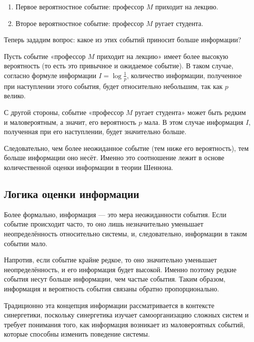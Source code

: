 \documentclass[12pt,a4paper]{article}
\newenvironment{exbox}[1][]{%
  \begin{tcolorbox}[enhanced, breakable, colback=excolor, colframe=brown!50!black, title=#1, fonttitle=\bfseries, arc=3pt, boxrule=0.5pt]
}{\end{tcolorbox}}
\newenvironment{rembox}[1][]{%
  \begin{tcolorbox}[enhanced, breakable, colback=gray!5, colframe=gray!50, title=#1, fonttitle=\bfseries, arc=3pt, boxrule=0.5pt]
}{\end{tcolorbox}}
\begin{document}
\begin{enumerate}
    \item Первое вероятностное событие: профессор $M$ приходит на лекцию.
    \item Второе вероятностное событие: профессор $M$ ругает студента.
\end{enumerate}

Теперь зададим вопрос: какое из этих событий приносит больше информации?

\begin{exbox}[Сравнение двух событий]
Пусть событие «профессор $M$ приходит на лекцию» имеет более высокую вероятность (то есть это привычное и ожидаемое событие). В таком случае, согласно формуле информации $I = \log \frac{1}{p}$, количество информации, полученное при наступлении этого события, будет относительно небольшим, так как $p$ велико.

С другой стороны, событие «профессор $M$ ругает студента» может быть редким и маловероятным, а значит, его вероятность $p$ мала. В этом случае информация $I$, полученная при его наступлении, будет значительно больше.
\end{exbox}

\begin{rembox}[Ключевое замечание]\label{remark:event_information}
Следовательно, чем более неожиданное событие (тем ниже его вероятность), тем больше информации оно несёт. Именно это соотношение лежит в основе количественной оценки информации в теории Шеннона.
\end{rembox}

\subsection{Логика оценки информации}

Более формально, информация — это мера неожиданности события. Если событие происходит часто, то оно лишь незначительно уменьшает неопределённость относительно системы, и, следовательно, информации в таком событии мало.

Напротив, если событие крайне редкое, то оно значительно уменьшает неопределённость, и его информация будет высокой. Именно поэтому редкие события несут больше информации, чем частые события. Таким образом, информация и вероятность события связаны обратно пропорционально.

\begin{rembox}[Контекст синергетики]
Традиционно эта концепция информации рассматривается в контексте синергетики, поскольку синергетика изучает самоорганизацию сложных систем и требует понимания того, как информация возникает из маловероятных событий, которые способны изменить поведение системы.
\end{rembox}
\end{document}
